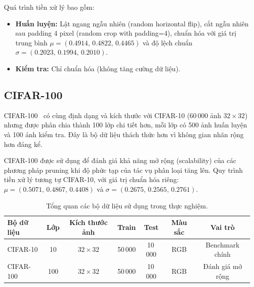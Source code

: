         Quá trình tiền xử lý bao gồm:
        \begin{itemize}
            \item \textbf{Huấn luyện:} Lật ngang ngẫu nhiên (random horizontal flip),
                  cắt ngẫu nhiên sau padding 4 pixel (random crop with padding=4),
                  chuẩn hóa với giá trị trung bình $\mu = (0.4914,\,0.4822,\,0.4465)$
                  và độ lệch chuẩn $\sigma = (0.2023,\,0.1994,\,0.2010)$.
            \item \textbf{Kiểm tra:} Chỉ chuẩn hóa (không tăng cường dữ liệu).
        \end{itemize}
         
        \subsection{CIFAR-100}
        \label{subsec:cifar100}
         
        CIFAR-100~\cite{krizhevsky2009learning} có cùng định dạng và kích thước với
        CIFAR-10 (60\,000 ảnh $32 \times 32$) nhưng được phân chia thành 100 lớp chi
        tiết hơn, mỗi lớp có 500 ảnh huấn luyện và 100 ảnh kiểm tra.
        Đây là bộ dữ liệu thách thức hơn vì không gian nhãn rộng hơn đáng kể.
         
        CIFAR-100 được sử dụng để đánh giá khả năng mở rộng (scalability) của
        các phương pháp pruning khi độ phức tạp của tác vụ phân loại tăng lên.
        Quy trình tiền xử lý tương tự CIFAR-10, với giá trị chuẩn hóa riêng:
        $\mu = (0.5071,\,0.4867,\,0.4408)$ và
        $\sigma = (0.2675,\,0.2565,\,0.2761)$.
         
        \begin{table}[htbp]
        \centering
        \caption{Tổng quan các bộ dữ liệu sử dụng trong thực nghiệm.}
        \label{tab:datasets}
        \begin{tabular}{lcccccc}
        \hline
        \textbf{Bộ dữ liệu} & \textbf{Lớp} & \textbf{Kích thước ảnh} & \textbf{Train} & \textbf{Test} & \textbf{Màu sắc} & \textbf{Vai trò} \\
        \hline
        CIFAR-10  & 10  & $32\times32$ & 50\,000 & 10\,000 & RGB & Benchmark chính  \\
        CIFAR-100 & 100 & $32\times32$ & 50\,000 & 10\,000 & RGB & Đánh giá mở rộng \\
        \hline
        \end{tabular}
        \end{table}

